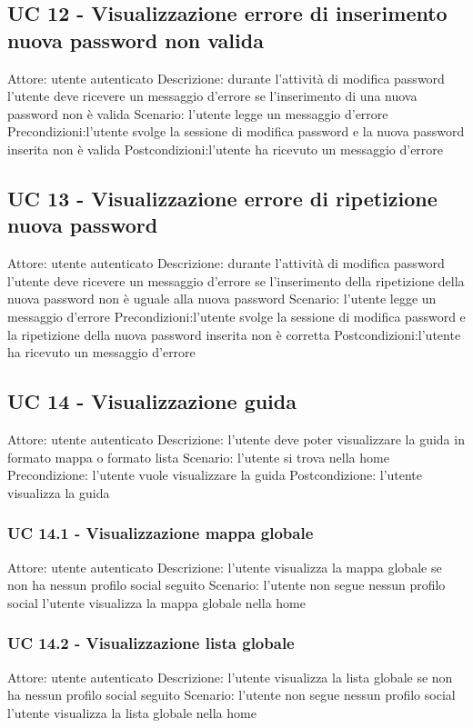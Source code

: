 \subsection{UC 12 - Visualizzazione errore di inserimento nuova password non valida}
Attore: utente autenticato
Descrizione: durante l’attività di modifica password l’utente deve ricevere un messaggio d’errore se l'inserimento di una nuova password non è valida
Scenario: l’utente legge un messaggio d’errore
Precondizioni:l’utente svolge la sessione di modifica password e la nuova password inserita non è valida
Postcondizioni:l’utente ha ricevuto un messaggio d’errore

\subsection{UC 13 - Visualizzazione errore di ripetizione nuova password}
Attore: utente autenticato
Descrizione: durante l’attività di modifica password l’utente deve ricevere un messaggio d’errore se l'inserimento della ripetizione della nuova password non è uguale alla nuova password 
Scenario: l’utente legge un messaggio d’errore
Precondizioni:l’utente svolge la sessione di modifica password e la ripetizione della nuova password inserita non è corretta
Postcondizioni:l’utente ha ricevuto un messaggio d’errore

\subsection{UC 14 - Visualizzazione guida}
Attore: utente autenticato
Descrizione: l’utente deve poter visualizzare la guida in formato mappa o formato lista
Scenario:
l’utente si trova nella home
Precondizione: l’utente vuole visualizzare la guida
Postcondizione: l’utente visualizza la guida

\subsubsection{UC 14.1 - Visualizzazione mappa globale}
Attore: utente autenticato
Descrizione: l’utente visualizza la mappa globale se non ha nessun profilo social seguito
Scenario:
l’utente non segue nessun profilo social
l’utente visualizza la mappa globale nella home

\subsubsection{UC 14.2 - Visualizzazione lista globale}
Attore: utente autenticato
Descrizione: l’utente visualizza la lista globale se non ha nessun profilo social seguito
Scenario:
l’utente non segue nessun profilo social
l’utente visualizza la lista globale nella home


